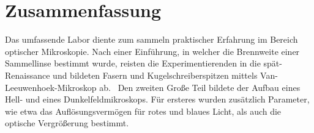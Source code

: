 \documentclass[ngerman]{scrartcl}
\begin{document}
\section{Zusammenfassung}
\label{sec:zusammenfassung}

Das umfassende Labor diente zum sammeln praktischer Erfahrung im Bereich optischer Mikroskopie. Nach einer Einführung, in welcher die Brennweite einer Sammellinse bestimmt wurde, reisten die Experimentierenden in die spät-Renaissance und bildeten Fasern und Kugelschreiberspitzen mittels Van-Leeuwenhoek-Mikroskop ab. \ Den zweiten Große Teil bildete der Aufbau eines Hell- und eines Dunkelfeldmikroskops. Für ersteres wurden zusätzlich Parameter, wie etwa das Auflösungsvermögen für rotes und blaues Licht, als auch die optische Vergrößerung bestimmt.



\clearpage
\printbibliography

\listoffigures

\listoftables
\end{document}
